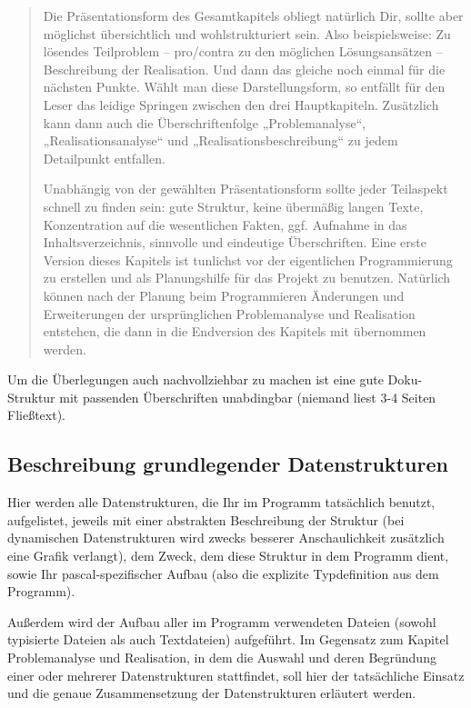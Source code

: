 \documentclass[12pt, letterpaper]{article}
\begin{document}
\begin{verse}
                    \item Die Präsentationsform des Gesamtkapitels obliegt natürlich Dir, sollte aber möglichst übersichtlich und wohlstrukturiert sein. Also beispielsweise: Zu lösendes Teilproblem – pro/contra zu den möglichen Lösungsansätzen – Beschreibung der Realisation. Und dann das gleiche noch einmal für die nächsten Punkte. Wählt man diese Darstellungsform, so entfällt für den Leser das leidige Springen zwischen den drei Hauptkapiteln. Zusätzlich kann dann auch die Überschriftenfolge „Problemanalyse“, „Realisationsanalyse“ und „Realisationsbeschreibung“ zu jedem Detailpunkt entfallen.

                    \item Unabhängig von der gewählten Präsentationsform sollte jeder Teilaspekt schnell zu finden sein: gute Struktur, keine übermäßig langen Texte, Konzentration auf die wesentlichen Fakten, ggf. Aufnahme in das Inhaltsverzeichnis, sinnvolle und eindeutige Überschriften. Eine erste Version dieses Kapitels ist tunlichst vor der eigentlichen Programmierung zu erstellen und als Planungshilfe für das Projekt zu benutzen. Natürlich können nach der Planung beim Programmieren Änderungen und Erweiterungen der ursprünglichen Problemanalyse und Realisation entstehen, die dann in die Endversion des Kapitels mit übernommen werden.
            \end{verse}
            Um die Überlegungen auch nachvollziehbar zu machen ist eine gute Doku-Struktur mit passenden Überschriften unabdingbar (niemand liest 3-4 Seiten Fließtext).
        
        \subsection{Beschreibung grundlegender Datenstrukturen}
            Hier werden alle Datenstrukturen, die Ihr im Programm tatsächlich benutzt, aufgelistet, jeweils mit einer abstrakten Beschreibung der Struktur (bei dynamischen Datenstrukturen wird zwecks besserer Anschaulichkeit zusätzlich eine Grafik verlangt), dem Zweck, dem diese Struktur in dem Programm dient, sowie Ihr pascal-spezifischer Aufbau (also die explizite Typdefinition aus dem Programm). 
            
            Außerdem wird der Aufbau aller im Programm verwendeten Dateien (sowohl typisierte Dateien als auch Textdateien) aufgeführt. Im Gegensatz zum Kapitel Problemanalyse und Realisation, in dem die Auswahl und deren Begründung einer oder mehrerer Datenstrukturen stattfindet, soll hier der tatsächliche Einsatz und die genaue Zusammensetzung der Datenstrukturen erläutert werden.
        
\end{document}
